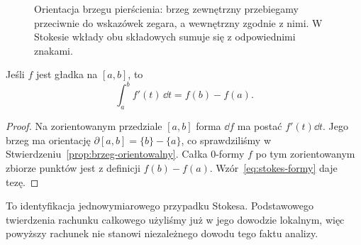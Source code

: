 \begin{figure}[!htbp]
\centering
{}
\caption{Orientacja brzegu pierścienia: brzeg
zewnętrzny przebiegamy przeciwnie do wskazówek zegara,
a wewnętrzny zgodnie z nimi. W Stokesie wkłady
obu składowych sumuje się z odpowiednimi znakami.}
\label{fig:stokes-pierscien}
\end{figure}

\begin{wniosek}
\label{cor:stokes-ftc}
Jeśli $f$ jest gładka na $[a,b]$, to
\[
 \int_a^b f'(t)\,\dd t=f(b)-f(a).
\]
\end{wniosek}
\begin{proof}
Na zorientowanym przedziale $[a,b]$ forma $\dd f$
ma postać $f'(t)\dd t$. Jego brzeg ma orientację
$\partial[a,b]=\{b\}-\{a\}$, co sprawdziliśmy
w Stwierdzeniu~\ref{prop:brzeg-orientowalny}.
Całka $0$-formy $f$ po tym zorientowanym
zbiorze punktów jest z definicji $f(b)-f(a)$.
Wzór~\eqref{eq:stokes-formy} daje tezę.
\end{proof}
To identyfikacja jednowymiarowego przypadku Stokesa.
Podstawowego twierdzenia rachunku całkowego użyliśmy
już w jego dowodzie lokalnym, więc powyższy rachunek
nie stanowi niezależnego dowodu tego faktu analizy.

